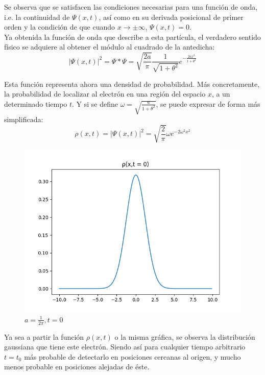 Se observa que se satisfacen las condiciones necesarias para una función de onda, i.e. la continuidad de $\Psi(x,t)$, 
así como en su derivada posicional de primer orden y la condición de que cuando $x\rightarrow\pm\infty$, $\Psi(x,t)=0$.\\

Ya obtenida la función de onda que describe a esta partícula, el verdadero sentido físico se adquiere al obtener el 
módulo al cuadrado de la antedicha:
\begin{equation*}
    \lvert\Psi(x,t)\rvert^2 = \Psi*\Psi = \sqrt{\frac{2a}{\pi}} \frac{1}{\sqrt{1+\theta^2}} e^{-\frac{2ax^2}{1+\theta^2}}
\end{equation*}

Esta función representa ahora una densidad de probabilidad. Más concretamente, la probabilidad de localizar al electrón 
en una región del espacio $x$, a un determinado tiempo $t$. Y si se define $\omega=\sqrt{\frac{a}{1+\theta^2}}$, se puede 
expresar de forma más simplificada:
\begin{equation}
    \rho(x,t) = \lvert\Psi(x,t)\rvert^2 = \sqrt{\frac{2}{\pi}} \omega e^{-2\omega^2x^2}
\end{equation}

\begin{figure}[H]
    \includegraphics[scale=0.45]{imagenes/graficas_particulalibre/rho(x,t).png}
    \caption{\emph{$a = \frac{1}{2\pi}, t = 0$}}
\end{figure}

Ya sea a partir la función $\rho(x,t)$ o la misma gráfica, se observa la distribución gaussiana que tiene este electrón. 
Siendo así para cualquier tiempo arbitrario $t=t_{0}$ más probable de detectarlo en posiciones cercanas al origen, y mucho 
menos probable en posiciones alejadas de éste.
